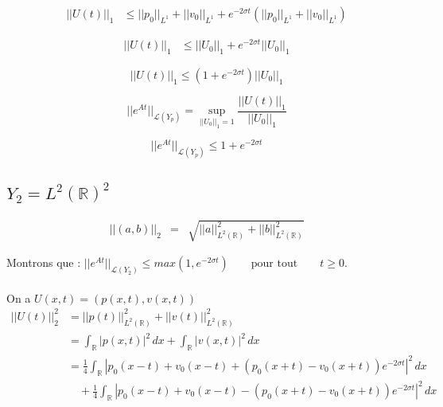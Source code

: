 \documentclass[a4paper,11pt]{article}
\begin{document}
\begin{equation*}
\begin{split}
    ||U(t)||_1 & \le ||p_0||_{L^{1}} + ||v_0||_{L^{1}} 
    + e^{-2\sigma t} \left(||p_0||_{L^{1}} + ||v_0||_{L^{1}} \right)
\end{split}
\end{equation*}

\begin{equation*}
\begin{split}
    ||U(t)||_1 & \le ||U_0||_{1} 
    + e^{-2\sigma t} ||U_0||_{1}
\end{split}
\end{equation*}

\begin{equation}
    ||U(t)||_1 \le \left( 1 + e^{-2\sigma t} \right) ||U_0||_{1}
\end{equation}

\begin{equation*}
||e^{At}||_{\mathcal{L}(Y_p)} = \sup_{||U_{0}||_1 = 1}\frac{||U(t)||_1}{||U_{0}||_1}
\end{equation*}

\begin{equation*}
    ||e^{At}||_{\mathcal{L}(Y_p)} \le 1 + e^{-2\sigma t}
\end{equation*}


\subsection{\( Y_{2} = L^{2}(\mathbb{R})^{2} \)}

\begin{equation*}
\begin{array}{rcl}
    ||(a,b)||_{2} &=& \sqrt{||a||^{2}_{L^{2}(\mathbb{R})} + ||b||^{2}_{L^{2}(\mathbb{R})}}
\end{array}
\end{equation*}

Montrons que :
\( ||e^{At}||_{\mathcal{L}(Y_2)}\leq max(1, e^{-2\sigma t}) \qquad \mbox{pour tout} \qquad t\geq 0. \)\\ \\
On a \( U(x,t)=(p(x,t),v(x,t)) \) \\

\begin{equation*}
\begin{split}
    ||U(t)||^{2}_{2} &= ||p(t)||^{2}_{L^{2}(\mathbb{R})} + ||v(t)||^{2}_{L^{2}(\mathbb{R})} \\
    &= \int_{\mathbb{R}}{|p(x,t)|^{2}\,dx} + \int_{\mathbb{R}}{|v(x,t)|^{2}\,dx} \\
    &= \frac{1}{4} \int_{\mathbb{R}} |p_0(x-t)+v_0(x-t) + (p_0(x+t)-v_0(x+t)) e^{-2\sigma t} |^{2} \,dx \\
    & \quad +\frac{1}{4} \int_{\mathbb{R}} |p_0(x-t) + v_0(x-t) - (p_0(x+t) - v_0(x+t)) e^{-2\sigma t}|^{2} \,dx 
\end{split}
\end{equation*}
\end{document}
